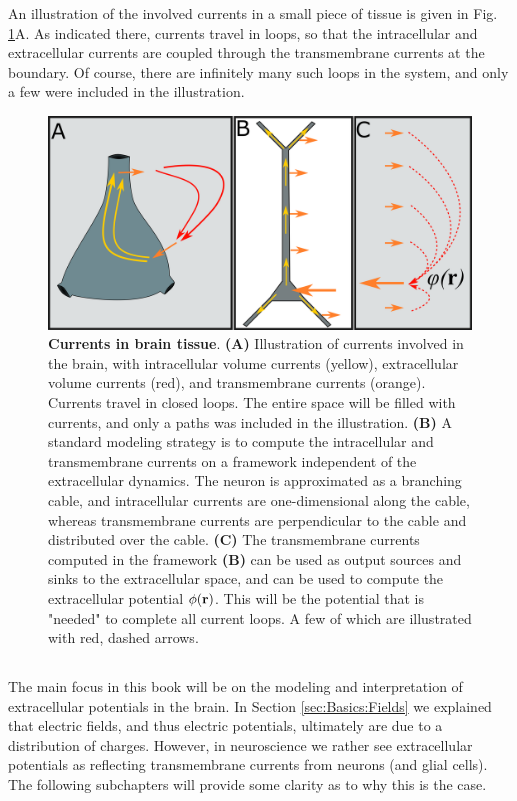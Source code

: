 An illustration of the involved currents in a small piece of tissue is given in Fig. \ref{fig:Basics:Twostep}A. As indicated there, currents travel in loops, so that the intracellular and extracellular currents are coupled through the transmembrane currents at the boundary. Of course, there are infinitely many such loops in the system, and only a few were included in the illustration. 

\begin{figure}[!ht]
\begin{center}
\includegraphics[width=1.0\textwidth]{Figures/Basics/Twostep.png}
\end{center}
\caption{{\bf Currents in brain tissue}. {\bf(A)} Illustration of currents involved in the brain, with intracellular volume currents (yellow), extracellular volume currents (red), and transmembrane currents (orange). Currents travel in closed loops. The entire space will be filled with currents, and only a paths was included in the illustration. {\bf(B)} A standard modeling strategy is to compute the intracellular and transmembrane currents on a framework independent of the extracellular dynamics. The neuron is approximated as a branching cable, and intracellular currents are one-dimensional along the cable, whereas transmembrane currents are perpendicular to the cable and distributed over the cable. {\bf(C)} The transmembrane currents computed in the framework {\bf(B)} can be used as output sources and sinks to the extracellular space, and can be used to compute the extracellular potential $\phi({\bf r})$. This will be the potential that is "needed" to complete all current loops. A few of which are illustrated with red, dashed arrows. 
}
\label{fig:Basics:Twostep}
\end{figure}


\subsection{}
\label{sec:Basics:ECSpot}
The main focus in this book will be on the modeling and interpretation of extracellular potentials in the brain. In Section \ref{sec:Basics:Fields} we explained that electric fields, and thus electric potentials, ultimately are due to a distribution of charges. However, in neuroscience we rather see extracellular potentials as reflecting transmembrane currents from neurons (and glial cells). The following subchapters will provide some clarity as to why this is the case. 


